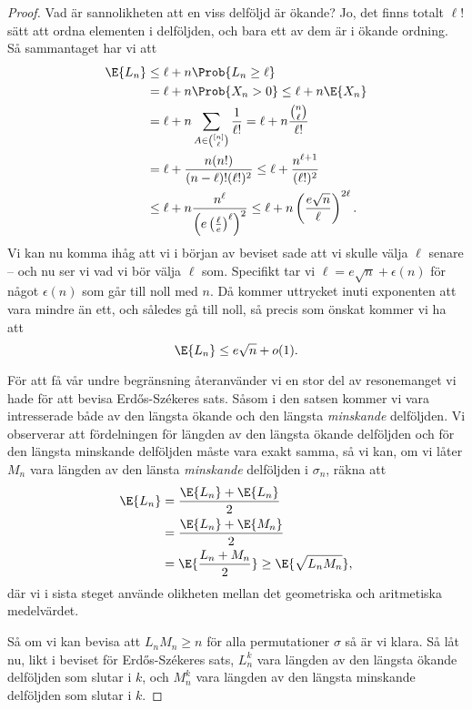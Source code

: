 \documentclass[nobib]{tufte-handout}
\begin{document}
\begin{theorem}
\begin{proof}
    Vad är sannolikheten att en viss delföljd är ökande? Jo, det finns totalt $\ell!$ sätt att ordna elementen i delföljden, och bara ett av dem är i ökande ordning. Så sammantaget har vi att
    \begin{align*}
      \E{L_n} &\leq \ell + n\Prob{L_n \geq \ell}\\
      &= \ell + n \Prob{X_n > 0} \leq \ell + n \E{X_n}\\
      &= \ell + n \sum_{A \in \binom{[n]}{\ell}} \frac{1}{\ell!} = \ell + n \frac{\binom{n}{\ell}}{\ell!}\\
      &= \ell + \frac{n (n!)}{(n-\ell)!(\ell!)^2} \leq \ell + \frac{n^{\ell + 1}}{(\ell!)^2}\\
      &\leq \ell + n \frac{n^\ell}{\left(e \left(\frac{\ell}{e}\right)^\ell\right)^2}
      \leq \ell + n\left(\frac{e\sqrt{n}}{\ell}\right)^{2\ell}.
    \end{align*}
    Vi kan nu komma ihåg att vi i början av beviset sade att vi skulle välja $\ell$ senare -- och nu ser vi vad vi bör välja $\ell$ som. Specifikt tar vi $\ell = e\sqrt{n} + \epsilon(n)$ för något $\epsilon(n)$ som går till noll med $n$. Då kommer uttrycket inuti exponenten att vara mindre än ett, och således gå till noll, så precis som önskat kommer vi ha att
    $$\E{L_n} \leq e\sqrt{n} + o(1).$$

    För att få vår undre begränsning återanvänder vi en stor del av resonemanget vi hade för att bevisa Erd\H{o}s-Székeres sats. Såsom i den satsen kommer vi vara intresserade både av den längsta ökande och den längsta \emph{minskande} delföljden. Vi observerar att fördelningen för längden av den längsta ökande delföljden och för den längsta minskande delföljden måste vara exakt samma, så vi kan, om vi låter $M_n$ vara längden av den länsta \emph{minskande} delföljden i $\sigma_n$, räkna att
    \begin{align*}
      \E{L_n} &= \frac{\E{L_n} + \E{L_n}}{2}\\
      &= \frac{\E{L_n} + \E{M_n}}{2}\\
      &= \E{\frac{L_n + M_n}{2}} \geq \E{\sqrt{L_n M_n}},
    \end{align*}
    där vi i sista steget använde olikheten mellan det geometriska och aritmetiska medelvärdet.

    Så om vi kan bevisa att $L_n M_n \geq n$ för alla permutationer $\sigma$ så är vi klara. Så låt nu, likt i beviset för Erd\H{o}s-Székeres sats, $L_n^k$ vara längden av den längsta ökande delföljden som slutar i $k$, och $M_n^k$ vara längden av den längsta minskande delföljden som slutar i $k$.


\end{proof}
\end{theorem}
\end{document}
